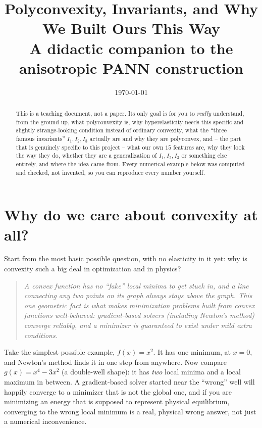 \documentclass[11pt,a4paper]{article}
\title{Polyconvexity, Invariants, and Why We Built Ours This Way\\
\large A didactic companion to the anisotropic PANN construction}
\author{}
\date{\today}
\newenvironment{takeaway}
 {\begin{quote}\small\itshape\color{blue!60!black}}
 {\end{quote}}
\begin{document}
\maketitle

\begin{abstract}
This is a teaching document, not a paper. Its only goal is for you to
\emph{really} understand, from the ground up, what polyconvexity is,
why hyperelasticity needs this specific and slightly strange-looking
condition instead of ordinary convexity, what the ``three famous
invariants'' $I_1,I_2,I_3$ actually are and why they are polyconvex,
and -- the part that is genuinely specific to this project -- what our
own $15$ features are, why they look the way they do, whether they are
a generalization of $I_1,I_2,I_3$ or something else entirely, and
where the idea came from. Every numerical example below was computed
and checked, not invented, so you can reproduce every number yourself.
\end{abstract}

\tableofcontents

\section{Why do we care about convexity at all?}
\label{sec:motivation}

Start from the most basic possible question, with no elasticity in it
yet: why is convexity such a big deal in optimization and in physics?

\begin{takeaway}
A convex function has no ``fake'' local minima to get stuck in, and a
line connecting any two points on its graph always stays above the
graph. This one geometric fact is what makes minimization problems
built from convex functions well-behaved: gradient-based solvers
(including Newton's method) converge reliably, and a minimizer is
guaranteed to exist under mild extra conditions.
\end{takeaway}

Take the simplest possible example, $f(x)=x^2$. It has one minimum, at
$x=0$, and Newton's method finds it in one step from anywhere. Now
compare $g(x)=x^4-3x^2$ (a double-well shape): it has \emph{two} local
minima and a local maximum in between. A gradient-based solver started
near the ``wrong'' well will happily converge to a minimizer that is
not the global one, and if you are minimizing an energy that is
supposed to represent physical equilibrium, converging to the wrong
local minimum is a real, physical wrong answer, not just a numerical
inconvenience.
\end{document}
